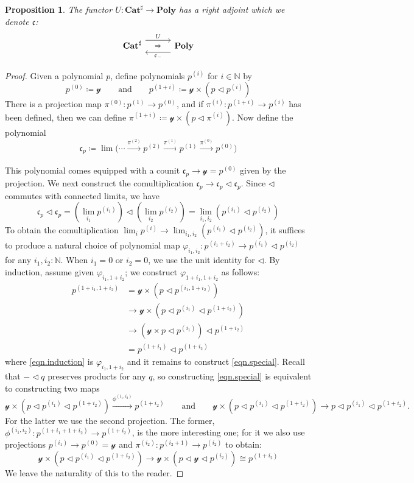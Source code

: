 \documentclass[11pt, one side, article]{memoir}
\newcommand{\adj}[5][30pt]{%
\begin{tikzcd}[ampersand replacement=\&, column sep=#1]
  #2\ar[r, shift left=7pt, "#3"]
  \ar[r, phantom, "\scriptstyle\Rightarrow"]\&
  #5\ar[l, shift left=7pt, "#4"]
\end{tikzcd}
}
\theoremstyle{definition}
\theoremstyle{plain}
\newtheorem{proposition}[definitionx]{Proposition}
\newcommand{\Cat}[1]{\mathbf{#1}}%
\newcommand{\To}[2][]{\xrightarrow[#1]{#2}}
\newcommand{\nn}{\mathbb{N}}
\newcommand{\catsharp}{\Cat{Cat}^{\sharp}}
\newcommand{\yon}{\mathcal{y}}
\newcommand{\poly}{\Cat{Poly}}
\newcommand{\tri}{\mathbin{\triangleleft}}
\newcommand{\cofree}{\mathfrak{c}}
\newcommand{\qqand}{\qquad\text{and}\qquad}
\newcommand{\coh}[1]{^{(#1)}}
\begin{document}
\begin{proposition}
The functor $U\colon\catsharp\to\poly$ has a right adjoint which we denote $\cofree$:
\[
\adj{\catsharp}{U}{\cofree_-}{\poly}
\]
\end{proposition}
\begin{proof}
Given a polynomial $p$, define polynomials $p^{(i)}$ for $i\in\nn$ by
\[
  p\coh{0}\coloneqq\yon
  \qqand
  p\coh{1+i}\coloneqq\yon\times(p\tri p\coh{i})
\]
There is a projection map $\pi\coh{0}\colon p\coh{1}\to p\coh{0}$, and if $\pi\coh{i}\colon p\coh{1+i}\to p\coh{i}$ has been defined, then we can define $\pi\coh{1+i}\coloneqq \yon\times(p\tri\pi\coh{i})$. Now define the polynomial
\[
\cofree_p\coloneqq\lim\big(\cdots\To{\pi\coh{2}}p\coh{2}\To{\pi\coh{1}}p\coh{1}\To{\pi\coh{0}}p\coh{0}\big)
\]

This polynomial comes equipped with a counit $\cofree_p\to\yon=p\coh{0}$ given by the projection. We next construct the comultiplication $\cofree_p\to\cofree_p\tri\cofree_p$. Since $\tri$ commutes with connected limits, we have
\[
  \cofree_p\tri\cofree_p=
  \left(\lim_{i_1}p\coh{i_1}\right)\tri\left(\lim_{i_2}p\coh{i_2}\right)=
  \lim_{i_1,i_2}\left(p\coh{i_1}\tri p\coh{i_2}\right)
\]
To obtain the comultiplication $\lim_ip\coh{i}\to\lim_{i_1,i_2}(p\coh{i_1}\tri p\coh{i_2})$, it suffices to produce a natural choice of polynomial map $\varphi_{i_1,i_2}\colon p\coh{i_1+i_2}\to p\coh{i_1}\tri p\coh{i_2}$ for any $i_1,i_2:\nn$. When $i_1=0$ or $i_2=0$, we use the unit identity for $\tri$. By induction, assume given $\varphi_{i_1,1+i_2}$; we construct $\varphi_{1+i_1,1+i_2}$ as follows:
\begin{align}
\nonumber
  p\coh{1+i_1,1+i_2}&=
  \yon\times \left(p\tri p\coh{i_1,1+i_2}\right)\\&\to
\label{eqn.induction}
  \yon\times \left(p\tri p\coh{i_1}\tri p\coh{1+i_2}\right)\\&\to
\label{eqn.special}
  \left(\yon\times p\tri p\coh{i_1}\right)\tri p\coh{1+i_2}\\&=
\nonumber
  p\coh{1+i_1}\tri p\coh{1+i_2}
\end{align}
where \eqref{eqn.induction} is $\varphi_{i_1,1+i_2}$ and it remains to construct \eqref{eqn.special}. Recall that $-\tri q$ preserves products for any $q$, so constructing \eqref{eqn.special} is equivalent to constructing two maps
\[
\yon\times \left(p\tri p\coh{i_1}\tri p\coh{1+i_2}\right)\To{\phi\coh{i_1,i_2}} p\coh{1+i_2}
\qqand
\yon\times \left(p\tri p\coh{i_1}\tri p\coh{1+i_2}\right)\to p\tri p\coh{i_1}\tri p\coh{1+i_2}.
\]
For the latter we use the second projection. The former, $\phi\coh{i_1,i_2}\colon p\coh{1+i_1+1+i_2}\to p\coh{1+i_2}$, is the more interesting one; for it we also use projections $p\coh{i_1}\to p\coh{0}=\yon$ and $\pi\coh{i_2}\colon p\coh{i_2+1}\to p\coh{i_2}$ to obtain:
\[
\yon\times \left(p\tri p\coh{i_1}\tri p\coh{1+i_2}\right)\to
\yon\times \left(p\tri\yon\tri p\coh{i_2}\right)\cong p\coh{1+i_2}
\]
We leave the naturality of this to the reader.


\end{proof}
\end{document}
